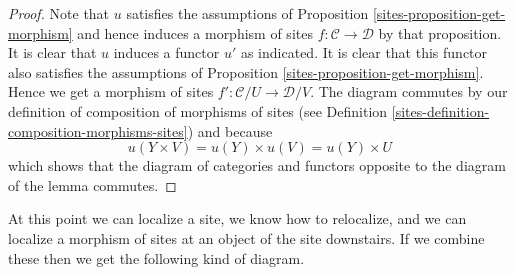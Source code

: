 \begin{proof}

Note that $u$ satisfies the assumptions of
Proposition \ref{sites-proposition-get-morphism} and hence induces
a morphism of sites $f : \mathcal{C} \to \mathcal{D}$ by that proposition.
It is clear that $u$ induces a functor $u'$ as indicated.
It is clear that this functor also satisfies the assumptions of
Proposition \ref{sites-proposition-get-morphism}.
Hence we get a morphism of sites $f' : \mathcal{C}/U \to \mathcal{D}/V$.
The diagram commutes by our definition of composition of morphisms of
sites (see Definition \ref{sites-definition-composition-morphisms-sites})
and because
$$
u(Y \times V) = u(Y) \times u(V) = u(Y) \times U
$$
which shows that the diagram of categories and functors opposite to
the diagram of the lemma commutes.
\end{proof}

At this point we can localize a site, we know how to relocalize,
and we can localize a morphism of sites at an object of the site downstairs.
If we combine these then we get the following kind of diagram.

